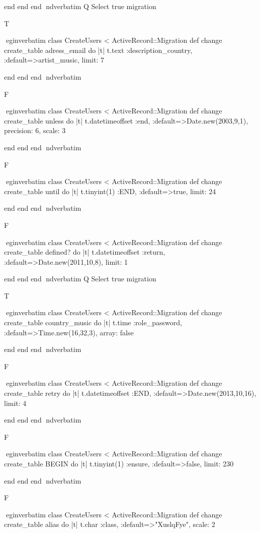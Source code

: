     end 
  end 
end
nd{verbatim}
Q
 Select true migration

T

egin{verbatim}
 class CreateUsers < ActiveRecord::Migration 
  def change 
    create_table adress_email do |t| 
      t.text :description_country, :default=>artist_music, limit: 7
    
    end 
  end 
end
nd{verbatim}

F

egin{verbatim}
 class CreateUsers < ActiveRecord::Migration 
  def change 
    create_table unless do |t| 
      t.datetimeoffset :end, :default=>Date.new(2003,9,1), precision: 6, scale: 3
    
    end 
  end 
end
nd{verbatim}

F

egin{verbatim}
 class CreateUsers < ActiveRecord::Migration 
  def change 
    create_table until do |t| 
      t.tinyint(1) :END, :default=>true, limit: 24
    
    end 
  end 
end
nd{verbatim}

F

egin{verbatim}
 class CreateUsers < ActiveRecord::Migration 
  def change 
    create_table defined? do |t| 
      t.datetimeoffset :return, :default=>Date.new(2011,10,8), limit: 1
    
    end 
  end 
end
nd{verbatim}
Q
 Select true migration

T

egin{verbatim}
 class CreateUsers < ActiveRecord::Migration 
  def change 
    create_table country_music do |t| 
      t.time :role_password, :default=>Time.new(16,32,3), array: false
    
    end 
  end 
end
nd{verbatim}

F

egin{verbatim}
 class CreateUsers < ActiveRecord::Migration 
  def change 
    create_table retry do |t| 
      t.datetimeoffset :END, :default=>Date.new(2013,10,16), limit: 4
    
    end 
  end 
end
nd{verbatim}

F

egin{verbatim}
 class CreateUsers < ActiveRecord::Migration 
  def change 
    create_table BEGIN do |t| 
      t.tinyint(1) :ensure, :default=>false, limit: 230
    
    end 
  end 
end
nd{verbatim}

F

egin{verbatim}
 class CreateUsers < ActiveRecord::Migration 
  def change 
    create_table alias do |t| 
      t.char :class, :default=>"XuslqFye", scale: 2
    
